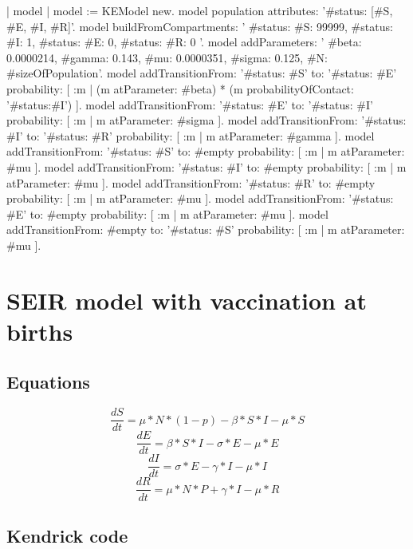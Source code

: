 \documentclass[a4paper,10pt,twoside]{book}
\begin{document}
\begin{code}{}
  | model |
	model := KEModel new.
	model population attributes: '{#status: [#S, #E, #I, #R]}'.
	model
		buildFromCompartments:
			'{
		{#status: #S}: 99999,
		{#status: #I}: 1,
		{#status: #E}: 0,
		{#status: #R}: 0
	}'.
	model addParameters: '{
		#beta: 0.0000214,
		#gamma: 0.143,
		#mu: 0.0000351,
		#sigma: 0.125,
		#N: #sizeOfPopulation}'.
	model
		addTransitionFrom: '{#status: #S}'
		to: '{#status: #E}'
		probability: [ :m | (m atParameter: #beta) * (m probabilityOfContact: '{#status:#I}') ].
	model
		addTransitionFrom: '{#status: #E}'
		to: '{#status: #I}'
		probability: [ :m | m atParameter: #sigma ].
	model
		addTransitionFrom: '{#status: #I}'
		to: '{#status: #R}'
		probability: [ :m | m atParameter: #gamma ].
	model
		addTransitionFrom: '{#status: #S}'
		to: #empty
		probability: [ :m | m atParameter: #mu ].
	model
		addTransitionFrom: '{#status: #I}'
		to: #empty
		probability: [ :m | m atParameter: #mu ].
	model
		addTransitionFrom: '{#status: #R}'
		to: #empty
		probability: [ :m | m atParameter: #mu ].
	model
		addTransitionFrom: '{#status: #E}'
		to: #empty
		probability: [ :m | m atParameter: #mu ].
	model
		addTransitionFrom: #empty
		to: '{#status: #S}'
		probability: [ :m | m atParameter: #mu ].
\end{code}

\section{ SEIR model with vaccination at births}\subsection{ Equations}

  \begin{equation}
    \frac{dS}{dt} = \mu*N*(1-p) - \beta*S*I - \mu*S
  \end{equation}
  \begin{equation}
    \frac{dE}{dt} = \beta*S*I - \sigma*E - \mu*E
  \end{equation}
  \begin{equation}
    \frac{dI}{dt} = \sigma*E - \gamma*I - \mu*I
  \end{equation}
  \begin{equation}
    \frac{dR}{dt} = \mu*N*P + \gamma*I - \mu*R
  \end{equation}
  
\subsection{ Kendrick code}
\end{document}
